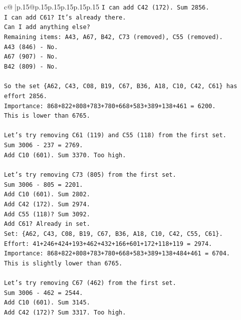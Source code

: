 \documentclass{article}
\begin{document}
{\begin{supertabular}{c@{$\;$}|p{.15\linewidth}@{}p{.15\linewidth}p{.15\linewidth}p{.15\linewidth}p{.15\linewidth}p{.15\linewidth}}
{{{\texttt{I can add C42 (172). Sum 2856.} \\
\texttt{I can add C61? It's already there.} \\
\texttt{Can I add anything else?} \\
\texttt{Remaining items: A43, A67, B42, C73 (removed), C55 (removed).} \\
\texttt{A43 (846) {-} No.} \\
\texttt{A67 (907) {-} No.} \\
\texttt{B42 (809) {-} No.} \\
\\ 
\texttt{So the set \{A62, C43, C08, B19, C67, B36, A18, C10, C42, C61\} has effort 2856.} \\
\texttt{Importance: 868+822+808+783+780+668+583+389+138+461 = 6200.} \\
\texttt{This is lower than 6765.} \\
\\ 
\texttt{Let's try removing C61 (119) and C55 (118) from the first set.} \\
\texttt{Sum 3006 {-} 237 = 2769.} \\
\texttt{Add C10 (601). Sum 3370. Too high.} \\
\\ 
\texttt{Let's try removing C73 (805) from the first set.} \\
\texttt{Sum 3006 {-} 805 = 2201.} \\
\texttt{Add C10 (601). Sum 2802.} \\
\texttt{Add C42 (172). Sum 2974.} \\
\texttt{Add C55 (118)? Sum 3092.} \\
\texttt{Add C61? Already in set.} \\
\texttt{Set: \{A62, C43, C08, B19, C67, B36, A18, C10, C42, C55, C61\}.} \\
\texttt{Effort: 41+246+424+193+462+432+166+601+172+118+119 = 2974.} \\
\texttt{Importance: 868+822+808+783+780+668+583+389+138+484+461 = 6704.} \\
\texttt{This is slightly lower than 6765.} \\
\\ 
\texttt{Let's try removing C67 (462) from the first set.} \\
\texttt{Sum 3006 {-} 462 = 2544.} \\
\texttt{Add C10 (601). Sum 3145.} \\
\texttt{Add C42 (172)? Sum 3317. Too high.} \\
}}}
\end{supertabular}}
\end{document}
